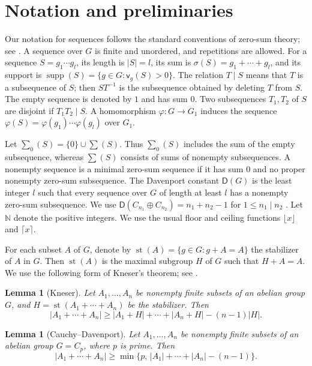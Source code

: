 \documentclass[10pt,reqno]{amsart}
\newtheorem{lem}[thm]{Lemma}
\theoremstyle{definition}
\theoremstyle{remark}
\numberwithin{equation}{section}
\newcommand{\N}{\mathbb N}
\DeclareMathOperator{\supp}{supp}
\DeclareMathOperator{\st}{st}
\begin{document}
\section{Notation and preliminaries}

Our notation for sequences follows the standard conventions of zero-sum
theory; see \cite{[GG2006],[GH2006]}.
A sequence over $G$ is finite and unordered, and repetitions are allowed.
For a sequence $S=g_1\cdots g_l$, its length is $|S|=l$, its sum is
$\sigma(S)=g_1+\cdots+g_l$, and its support is
$\supp(S)=\{g\in G:\mathsf v_g(S)>0\}$.
The relation $T\mid S$ means that $T$ is a subsequence of $S$;
then $ST^{-1}$ is the subsequence obtained by deleting $T$ from $S$.
The empty sequence is denoted by $1$ and has sum $0$.
Two subsequences $T_1,T_2$ of $S$ are disjoint if $T_1T_2\mid S$.
A homomorphism $\varphi:G\to G_1$ induces the sequence
$\varphi(S)=\varphi(g_1)\cdots\varphi(g_l)$ over $G_1$.

Let $\sum_0(S)=\{0\}\cup\sum(S)$.
Thus $\sum_0(S)$ includes the sum of the empty subsequence, whereas
$\sum(S)$ consists of sums of nonempty subsequences.
A nonempty sequence is a minimal zero-sum sequence if it has sum $0$
and no proper nonempty zero-sum subsequence.
The Davenport constant $\mathsf D(G)$ is the least integer $l$ such that
every sequence over $G$ of length at least $l$ has a nonempty zero-sum
subsequence. We use
$\mathsf D(C_{n_1}\oplus C_{n_2})=n_1+n_2-1$ for $1\le n_1\mid n_2$
\cite[Theorem~5.8.3]{[GH2006]}.
Let $\N$ denote the positive integers. We use the usual floor and
ceiling functions $\lfloor x\rfloor$ and $\lceil x\rceil$.

For each subset $A$ of $G$, denote by $\st(A) = \{g \in G : g + A = A\}$ the stabilizer of $A$ in $G$. Then $\st(A)$ is the maximal subgroup $H$ of $G$ such that $H + A = A$. We use the following form of Kneser's theorem; see \cite[Theorem~4.4]{[N1996]}.

\begin{lem}[Kneser]\label{lem2.1}
	Let $A_1,...,A_n$ be nonempty finite subsets of an
	abelian group $G$, and $H= \st(A_1+\cdots +A_n)$ be the stabilizer. Then
	$$|A_1+\cdots +A_n| \ge  |A_1+H|+\cdots +|A_n+H| -(n-1)|H|.$$
	
\end{lem}

\begin{lem}[Cauchy--Davenport]\label{lem2.2}
	Let $A_1,...,A_n$ be nonempty finite subsets of an
	abelian group $G=C_p$, where $p$ is prime. Then
	$$|A_1+\cdots +A_n|\ge\min\{p,\,|A_1|+\cdots +|A_n|-(n-1)\}.$$
	
\end{lem}
\end{document}
